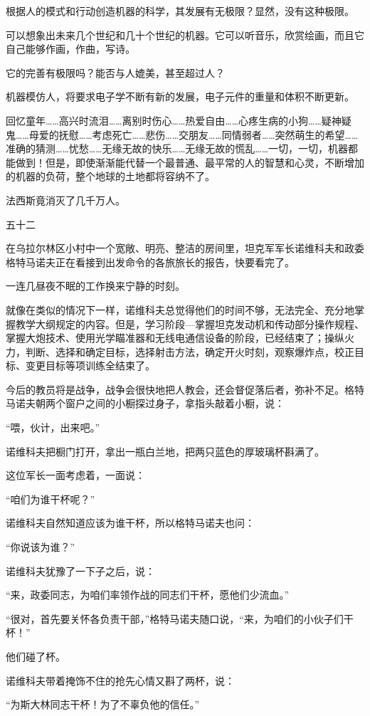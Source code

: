 根据人的模式和行动创造机器的科学，其发展有无极限？显然，没有这种极限。

可以想象出未来几个世纪和几十个世纪的机器。它可以听音乐，欣赏绘画，而且它自己能够作画，作曲，写诗。

它的完善有极限吗？能否与人媲美，甚至超过人？

机器模仿人，将要求电子学不断有新的发展，电子元件的重量和体积不断更新。

回忆童年……高兴时流泪……离别时伤心……热爱自由……心疼生病的小狗……疑神疑鬼……母爱的抚慰……考虑死亡……悲伤……交朋友……同情弱者……突然萌生的希望……准确的猜测……忧愁……无缘无故的快乐……无缘无故的慌乱……一切，一切，机器都能做到！但是，即使渐渐能代替一个最普通、最平常的人的智慧和心灵，不断增加的机器的负荷，整个地球的土地都将容纳不了。

法西斯竟消灭了几千万人。

五十二

在乌拉尔林区小村中一个宽敞、明亮、整洁的房间里，坦克军军长诺维科夫和政委格特马诺夫正在看接到出发命令的各旅旅长的报告，快要看完了。

一连几昼夜不眠的工作换来宁静的时刻。

就像在类似的情况下一样，诺维科夫总觉得他们的时间不够，无法完全、充分地掌握教学大纲规定的内容。但是，学习阶段—掌握坦克发动机和传动部分操作规程、掌握大炮技术、使用光学瞄准器和无线电通信设备的阶段，已经结束了；操纵火力，判断、选择和确定目标，选择射击方法，确定开火时刻，观察爆炸点，校正目标、变更目标等项训练全结束了。

今后的教员将是战争，战争会很快地把人教会，还会督促落后者，弥补不足。格特马诺夫朝两个窗户之间的小橱探过身子，拿指头敲着小橱，说：

“喂，伙计，出来吧。”

诺维科夫把橱门打开，拿出一瓶白兰地，把两只蓝色的厚玻璃杯斟满了。

这位军长一面考虑着，一面说：

“咱们为谁干杯呢？”

诺维科夫自然知道应该为谁干杯，所以格特马诺夫也问：

“你说该为谁？”

诺维科夫犹豫了一下子之后，说：

“来，政委同志，为咱们率领作战的同志们干杯，愿他们少流血。”

“很对，首先要关怀各负责干部，”格特马诺夫随口说，“来，为咱们的小伙子们干杯！”

他们碰了杯。

诺维科夫带着掩饰不住的抢先心情又斟了两杯，说：

“为斯大林同志干杯！为了不辜负他的信任。”

